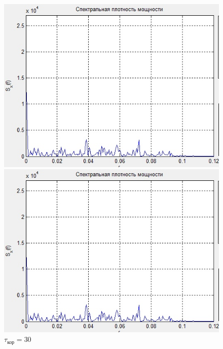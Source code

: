  \begin{figure}[H]
	\begin{minipage}{0.3\linewidth}
		\centering
        \includegraphics[width=\linewidth]{fig/realize10_sp.jpg}
		\caption*{$\tau_\text{кор}=10$}
	\end{minipage}
	\begin{minipage}{0.3\linewidth}
		\centering
        \includegraphics[width=\linewidth]{fig/realize10_sp.jpg}
		\caption*{$\tau_\text{кор}=30$}
	\end{minipage}
	\begin{minipage}{0.3\linewidth}
		\centering

\end{minipage}
\end{figure}
